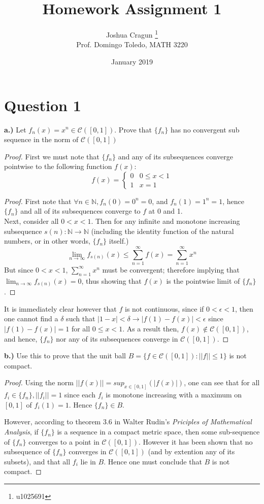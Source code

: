 \documentclass[12pt, letterpaper]{article}
\title{Homework Assignment 1}
\author{Joshua Cragun \thanks{u1025691} \\ Prof. Domingo Toledo, MATH 3220}
\date{January 2019}
\begin{document}
\begin{titlepage}
\maketitle
\end{titlepage}

\section*{Question 1}
\noindent\textbf{a.)} Let $f_n(x) = x^n \in \mathcal{C}([0,1])$. Prove that $\{f_n\}$ has no convergent sub sequence in the norm of $\mathcal{C}([0,1])$

\begin{proof}
  First we must note that $\{f_n\}$ and any of its subsequences converge pointwise to the following function $f(x)$:
  \[
  f(x) =
  \begin{cases}
      0 & 0 \leq x < 1 \\
      1 & x = 1
   \end{cases}
  \]
  \begin{proof}
    First note that $\forall n \in \mathbb{N}, f_n(0) = 0^n = 0$, and $f_n(1) = 1^n = 1$, hence $\{f_n\}$ and all of its subsequences converge to $f$ at 0 and 1.\\

    \noindent Next, consider all $0 < x < 1$. Then for any infinite and monotone increasing subsequence $s(n):\mathbb{N} \to \mathbb{N}$ (including the identity function of the natural numbers, or in other words, $\{f_n\}$ itself.)
    $$\lim_{n\to\infty}f_{s(n)}(x) \leq \sum_{n=1}^{\infty}f(x) = \sum_{n=1}^{\infty}x^n$$
    But since $0 < x < 1$, $\sum_{n=1}^{\infty}x^n$ must be convergent; therefore implying that $\lim_{n\to\infty}f_{s(n)}(x) = 0$, thus showing that $f(x)$ is the pointwise limit of $\{f_n\}$.
  \end{proof}
  \noindent It is immediately clear however that $f$ is not continuous, since if $ 0 < \epsilon < 1$, then one cannot find a $\delta$ such that $|1 - x| < \delta \rightarrow |f(1) - f(x)| < \epsilon$ since $|f(1) - f(x)| = 1$ for all $0 \leq x < 1$. As a result then, $f(x) \notin \mathcal{C}([0,1])$, and hence, $\{f_n\}$ nor any of its subsequences converge in $\mathcal{C}([0,1])$.
\end{proof}
\noindent\textbf{b.)} Use this to prove that the unit ball $B = \{f \in \mathcal{C}([0,1]) : ||f|| \leq 1\}$ is not compact.
\begin{proof}
  Using the norm $||f(x)|| = sup_{x\in[0,1]}(|f(x)|)$, one can see that for all $f_i\in\{f_n\}, ||f_i|| = 1$ since each $f_i$ is monotone increasing with a maximum on $[0,1]$ of $f_i(1) = 1$. Hence $\{f_n\} \in B$.\par However, according to theorem 3.6 in Walter Rudin's \textit{Priciples of Mathematical Analysis}, if $\{f_n\}$ is a sequence in a compact metric space, then some sub-sequence of $\{f_n\}$ converges to a point in $\mathcal{C}([0,1])$. However it has been shown that no subsequence of $\{f_n\}$ converges in $\mathcal{C}([0,1])$ (and by extention any of its subsets), and that all $f_i$ lie in $B$. Hence one must conclude that $B$ is not compact.
\end{proof}
\end{document}
